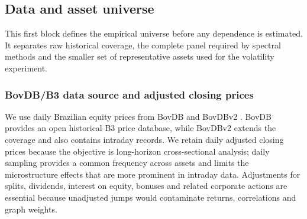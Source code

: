 \begin{center}
{%
}
\label{fig:methodology_overview}
\end{center}

\subsection{Data and asset universe}
\label{subsec:data_universe}

This first block defines the empirical universe before any dependence is estimated. It separates raw historical coverage, the complete panel required by spectral methods and the smaller set of representative assets used for the volatility experiment.

\subsubsection{BovDB/B3 data source and adjusted closing prices}
\label{subsec:bovdb_prices}

We use daily Brazilian equity prices from BovDB and BovDBv2 \cite{cardoso_2022_bovdb,souza_2024_bovdbv2}. BovDB provides an open historical B3 price database, while BovDBv2 extends the coverage and also contains intraday records. We retain daily adjusted closing prices because the objective is long-horizon cross-sectional analysis; daily sampling provides a common frequency across assets and limits the microstructure effects that are more prominent in intraday data. Adjustments for splits, dividends, interest on equity, bonuses and related corporate actions are essential because unadjusted jumps would contaminate returns, correlations and graph weights.

